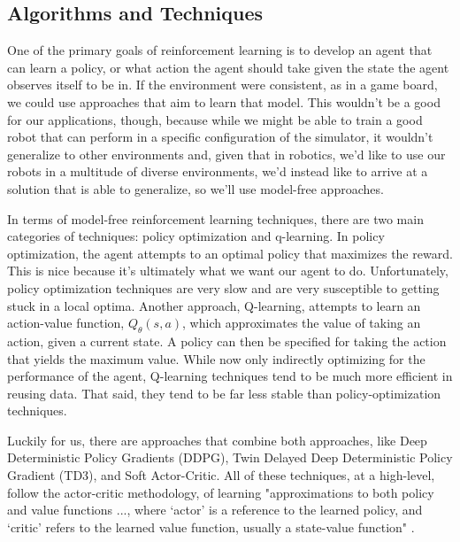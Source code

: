 \documentclass{article}
\begin{document}
\subsection{Algorithms and Techniques}
One of the primary goals of reinforcement learning is to develop an agent that can learn a policy, or what action the agent should take given the state the agent observes itself to be in. If the environment were consistent, as in a game board, we could use approaches that aim to learn that model. This wouldn't be a good for our applications, though, because while we might be able to train a good robot that can perform in a specific configuration of the simulator, it wouldn't generalize to other environments and, given that in robotics, we'd like to use our robots in a multitude of diverse environments, we'd instead like to arrive at a solution that is able to generalize, so we'll use model-free approaches. 

In terms of model-free reinforcement learning techniques, there are two main categories of techniques: policy optimization and q-learning. In policy optimization, the agent attempts to an optimal policy that maximizes the reward. This is nice because it's ultimately what we want our agent to do. Unfortunately, policy optimization techniques are very slow and are very susceptible to getting stuck in a local optima. Another approach, Q-learning, attempts to learn an action-value function, $Q_{\theta}(s, a)$, which approximates the value of taking an action, given a current state. A policy can then be specified for taking the action that yields the maximum value. While now only indirectly optimizing for the performance of the agent, Q-learning techniques tend to be much more efficient in reusing data. That said, they tend to be far less stable than policy-optimization techniques. 

Luckily for us, there are approaches that combine both approaches, like Deep Deterministic Policy Gradients (DDPG), Twin Delayed Deep Deterministic Policy Gradient (TD3), and Soft Actor-Critic. All of these techniques, at a high-level, follow the actor-critic methodology, of learning "approximations to both policy and value functions ..., where ‘actor’ is a reference to the learned policy, and ‘critic’ refers to the learned value function, usually a state-value function" \cite{Sutton:2018:RLI:3312046}. 
\end{document}
